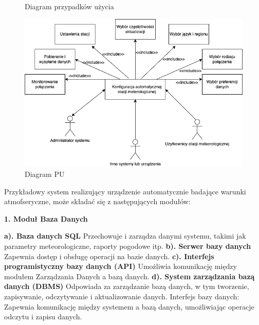 \documentclass{article}
\begin{document}
\begin{center}
    \begin{figure}
        \centering
        \begin{minipage}{0.6\textwidth}
            \centering
            \large Diagram przypadków użycia
        \end{minipage}
        \includegraphics[scale=0.5]{pu.png}
        \caption{Diagram PU}
        \label{etykieta11}
    \end{figure}

    \large Przykładowy system realizujący urządzenie automatycznie badające warunki atmofseryczne, może składać się z następujących modułów: \newline \newline
    \begin{center}
        \textbf{1. Moduł Baza Danych} 
    \end{center}
    \begin{flushleft}
        \textbf{a). Baza danych SQL} Przechowuje i zarządza danymi systemu, takimi jak parametry meteorologiczne, raporty pogodowe itp. \newline
        \textbf{b). Serwer bazy danych} Zapewnia dostęp i obsługę operacji na bazie danych. \newline
        \textbf{c). Interfejs programistyczny bazy danych (API)} Umożliwia komunikację między modułem Zarządzania Danych a bazą danych. \newline
        \textbf{d). System zarządzania bazą danych (DBMS)} Odpowiada za zarządzanie bazą danych, w tym tworzenie, zapisywanie, odczytywanie i aktualizowanie danych.
        Interfejs bazy danych: Zapewnia komunikację między systemem a bazą danych, umożliwiając operacje odczytu i zapisu danych. \newline
    \end{flushleft}
\end{center}
\end{document}
